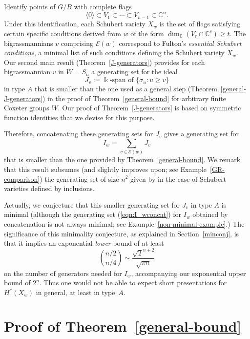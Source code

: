 \documentclass[12pt,dvips]{amsart}
\theoremstyle{plain}
\theoremstyle{definition}
\theoremstyle{remark}
\numberwithin{equation}{section}
\def\CC{{\mathbb C}}
\def\Ess{{\mathcal{E}}}
\begin{document}
Identify points of 
$G/B$ with complete flags 
$$
\langle 0 \rangle \subset V_1 \subset \cdots \subset V_{n-1} \subset \CC^n.
$$ 
Under this identification, each Schubert variety $X_w$ is the set of
flags satisfying certain specific conditions derived from $w$ of the
form $\dim_\CC (V_r \cap \CC^s)\geq t$.  The bigrassmannians $v$
comprising $\Ess(w)$ correspond to Fulton's {\it essential Schubert
  conditions}, a minimal list of such conditions defining the Schubert
variety $X_w$.  Our second main result (Theorem~\ref{J-generators})
provides for each bigrassmannian $v$ in $W=S_n$ a generating set for the ideal
\begin{equation}
\label{eqn:J_vgenset}
J_v:=\Bbbk\text{-span of }\{ \sigma_u: u \geq v \}
\end{equation}
in type $A$ that is smaller than the one used as a general
step (Theorem~\ref{general-J-generators}) in the proof of Theorem~\ref{general-bound}
for arbitrary finite Coxeter groups $W$.  Our proof of 
Theorem~\ref{J-generators} is based on symmetric function identities that we devise for this
purpose.

Therefore, concatenating these generating sets for $J_v$ gives a generating set for
\begin{equation}
\label{eqn:I_wconcat}
I_w = \sum_{v \in \Ess(w)} J_v
\end{equation}
that is smaller than the one provided by Theorem~\ref{general-bound}.
We remark that this result subsumes (and slightly improves upon;
see Example~\ref{GR-comparison}) 
the generating set of size $n^2$ given by \cite{GasharovReiner} 
in the case of Schubert varieties defined by inclusions.

Actually, we conjecture that this smaller generating set for $J_v$ in
type $A$ is minimal (although the generating set (\ref{eqn:I_wconcat})
for $I_w$ obtained by concatenation is not always minimal; see
Example~\ref{non-minimal-example}.)  The significance of this
minimality conjecture, as explained in Section~\ref{minconj}, is that
it implies an exponential \emph{lower} bound of at least
\[\binom{n/2}{n/4} \sim \frac{{\sqrt 2}^{n+2}}{\sqrt{\pi n}}\]
on the number of generators needed for $I_w$, accompanying our
exponential upper bound of $2^n$.  Thus one would not be able to expect
short presentations for $H^*(X_w)$ in general, at least in type~$A$.


\section{Proof of Theorem~\ref{general-bound}}
\label{Hiller-section}
\end{document}
